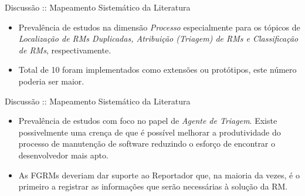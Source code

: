 \documentclass[t,14pt,mathserif]{beamer}
\begin{document}
\begin{frame}{Discussão :: Mapeamento Sistemático da Literatura}

    \begin{itemize}

        \item Prevalência de estudos na dimensão \textit{Processo} especialmente
            para os tópicos de \textit{Localização de RMs Duplicadas, Atribuição
                (Triagem) de RMs e Classificação de RMs}, respectivamente.

        \item Total de 10 foram implementados como extensões ou protótipos, este
              número poderia ser maior.

    \end{itemize}

\end{frame}

\begin{frame}{Discussão :: Mapeamento Sistemático da Literatura}

    \begin{itemize}
        \item Prevalência de estudos com foco no papel de
            \textit{Agente de Triagem}. Existe possivelmente uma crença de que é
            possível melhorar a produtividade do processo de manutenção de
            software reduzindo o esforço de encontrar o desenvolvedor mais apto.

        \item As FGRMs deveriam dar suporte ao Reportador que, na maioria da
            vezes, é o primeiro a registrar as informações que serão necessárias
            à solução da RM\@.

    \end{itemize}

\end{frame}
\end{document}

